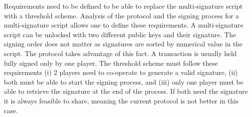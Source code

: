 Requirements need to be defined to be able to replace the multi-signature script
with a threshold scheme. Analysis of the protocol and the signing process for a
multi-signature script allows one to define these requirements. A multi-signature
script can be unlocked with two different public keys and their signature. The
signing order does not matter as signatures are sorted by numerical value in the script.
The protocol takes advantage of this fact. A transaction is usually held fully signed
only by one player. The threshold scheme must follow these requirements (i) 2
players need to co-operate to generate a valid signature, (ii) both must be able
to start the signing process, and (iii) only one player must be able to retrieve
the signature at the end of the process. If both need the signature it is
always feasible to share, meaning the current protocol is not better in this case.

